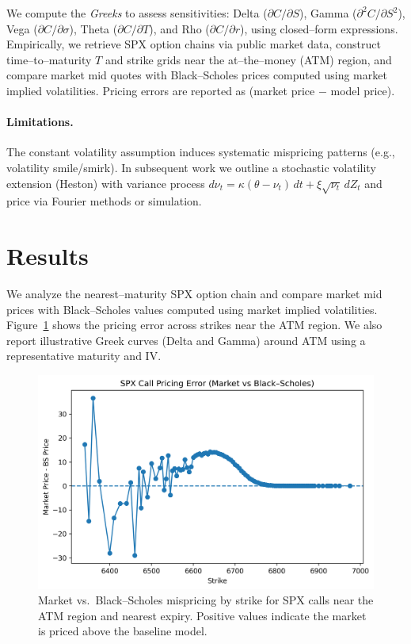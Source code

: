 \documentclass[12pt]{article}
\begin{document}
We compute the \emph{Greeks} to assess sensitivities: Delta ($\partial C/\partial S$), Gamma ($\partial^2 C/\partial S^2$),
Vega ($\partial C/\partial \sigma$), Theta ($\partial C/\partial T$), and Rho ($\partial C/\partial r$), using closed--form expressions.
Empirically, we retrieve SPX option chains via public market data, construct time--to--maturity $T$ and strike grids near the
at--the--money (ATM) region, and compare market mid quotes with Black--Scholes prices computed using market implied volatilities.
Pricing errors are reported as (market price $-$ model price).

\paragraph{Limitations.}
The constant volatility assumption induces systematic mispricing patterns (e.g., volatility smile/smirk). In subsequent work we outline
a stochastic volatility extension (Heston) with variance process
$d\nu_t = \kappa(\theta-\nu_t)\,dt + \xi \sqrt{\nu_t}\, dZ_t$ and price via Fourier methods or simulation.

\section{Results}
We analyze the nearest--maturity SPX option chain and compare market mid prices with Black--Scholes values computed using market
implied volatilities. Figure~\ref{fig:pricing-error} shows the pricing error across strikes near the ATM region.
We also report illustrative Greek curves (Delta and Gamma) around ATM using a representative maturity and IV.

\begin{figure}[H]
\centering
\includegraphics[width=0.85\linewidth]{pricing_error_vs_strike.png}
\caption{Market vs.\ Black--Scholes mispricing by strike for SPX calls near the ATM region and nearest expiry.
Positive values indicate the market is priced above the baseline model.}
\label{fig:pricing-error}
\end{figure}
\end{document}
